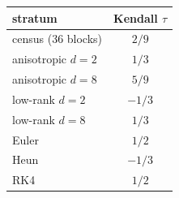 \begin{tabular}{lc}
\toprule
stratum & Kendall $\tau$ \\
\midrule
census (36 blocks) & $2/9$ \\
anisotropic $d=2$ & $1/3$ \\
anisotropic $d=8$ & $5/9$ \\
low-rank $d=2$ & $-1/3$ \\
low-rank $d=8$ & $1/3$ \\
Euler & $1/2$ \\
Heun & $-1/3$ \\
RK4 & $1/2$ \\
\bottomrule
\end{tabular}
